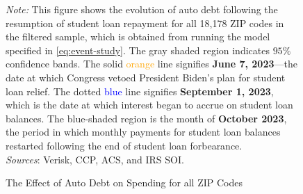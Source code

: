 \documentclass[12pt]{article}
\begin{document}
\begin{figure}[!ht]
    \centering
    \caption{The Effect of Auto Debt on Spending for all ZIP Codes}\label{fig:auto}
    \resizebox{\linewidth}{!}
    {
    
    }
    \label{fig:agg-spending-auto-placebo}

    \raggedright     \footnotesize{
    \emph{Note:} This figure shows the evolution of auto debt following the resumption of student loan repayment for all 18,178 ZIP codes in the filtered sample, which is obtained from running the model specified in \cref{eq:event-study}. The gray shaded region indicates $95\%$ confidence bands. The solid \textcolor{orange}{orange} line signifies \textbf{June 7, 2023}---the date at which Congress vetoed President Biden's plan for student loan relief. The dotted \textcolor{blue}{blue} line signifies \textbf{September 1, 2023}, which is the date at which interest began to accrue on student loan balances. The blue-shaded region is the month of \textbf{October 2023}, the period in which monthly payments for student loan balances restarted following the end of student loan forbearance.
	\\
	\textit{Sources}: Verisk, CCP, ACS, and IRS SOI.
	}
\end{figure}


% 	

\end{document}
